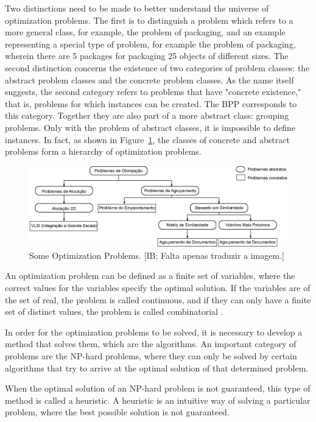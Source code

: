 \documentclass[conference,harvard,brazil,english]{sbatex}
\newcommand{\commentib}[1]{{\color{blue} [IB: #1]}}
\begin{document}
Two distinctions need to be made to better understand the universe of optimization problems. The first is to distinguish a problem which refers to a more general class, for example, the problem of packaging, and an example representing a special type of problem, for example the problem of packaging, wherein there are 5 packages for packaging 25 objects of different sizes. The second distinction concerns the existence of two categories of problem classes: the abstract problem classes and the concrete problem classes. As the name itself suggests, the second category refers to problems that have "concrete existence," that is, problems for which instances can be created. The BPP corresponds to this category. Together they are also part of a more abstract class: grouping problems. Only with the problem of abstract classes, it is impossible to define instances. In fact, as shown in Figure~\ref{fig:problemasDeOtimizacao}, the classes of concrete and abstract problems form a hierarchy of optimization problems.

\begin{figure}[h]
	\centering
	\includegraphics[width=1.0\textwidth]{problemasDeOtimizacao.eps}
	\caption{Some Optimization Problems.\commentib{Falta apenas traduzir a imagem.} \label{fig:problemasDeOtimizacao}}
	\end{figure}
	
	An optimization problem can be defined as a finite set of variables, where the correct values for the variables specify the optimal solution. If the variables are of the set of real, the problem is called continuous, and if they can only have a finite set of distinct values, the problem is called combinatorial \protect\cite{francq2011optimization}.
	
	In order for the optimization problems to be solved, it is necessary to develop a method that solves them, which are the algorithms. An important category of problems are the NP-hard problems, where they can only be solved by certain algorithms that try to arrive at the optimal solution of that determined problem.
	
	When the optimal solution of an NP-hard problem is not guaranteed, this type of method is called a heuristic. A heuristic is an intuitive way of solving a particular problem, where the best possible solution is not guaranteed.
	
\end{document}

